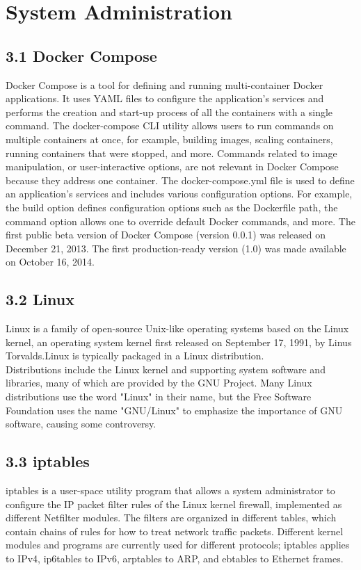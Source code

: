 \chapter{System Administration}

\section*{3.1 \hspace{1cm} Docker Compose}
Docker Compose is a tool for defining and running multi-container Docker applications. It uses YAML files to configure the application's services and performs the creation and start-up process of all the containers with a single command. The docker-compose CLI utility allows users to run commands on multiple containers at once, for example, building images, scaling containers, running containers that were stopped, and more. Commands related to image manipulation, or user-interactive options, are not relevant in Docker Compose because they address one container. The docker-compose.yml file is used to define an application's services and includes various configuration options. For example, the build option defines configuration options such as the Dockerfile path, the command option allows one to override default Docker commands, and more. The first public beta version of Docker Compose (version 0.0.1) was released on December 21, 2013. The first production-ready version (1.0) was made available on October 16, 2014.

\section*{3.2 \hspace{1cm} Linux}
Linux is a family of open-source Unix-like operating systems based on the Linux kernel, an operating system kernel first released on September 17, 1991, by Linus Torvalds.Linux is typically packaged in a Linux distribution. \\

Distributions include the Linux kernel and supporting system software and libraries, many of which are provided by the GNU Project. Many Linux distributions use the word "Linux" in their name, but the Free Software Foundation uses the name "GNU/Linux" to emphasize the importance of GNU software, causing some controversy.

\section*{3.3 \hspace{1cm} iptables}
iptables is a user-space utility program that allows a system administrator to configure the IP packet filter rules of the Linux kernel firewall, implemented as different Netfilter modules. The filters are organized in different tables, which contain chains of rules for how to treat network traffic packets. Different kernel modules and programs are currently used for different protocols; iptables applies to IPv4, ip6tables to IPv6, arptables to ARP, and ebtables to Ethernet frames. \\

